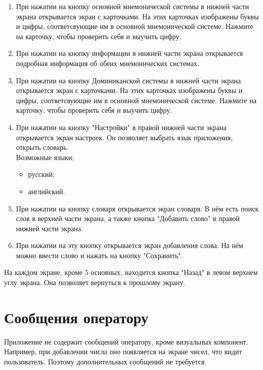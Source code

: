 \documentclass[draft]{article}
\begin{document}
\begin{enumerate}
\item При нажатии на кнопку основной мнемонической системы в нижней части экрана открывается экран с карточками. На этих карточках изображены буквы и цифры, соответсвующие им в основной мнемонической системе. Нажмите на карточку, чтобы проверить себя и выучить цифру.
\item При нажатии на кнопку информации в нижней части экрана открывается подробная информация об обеих мнемонических системах.
\item При нажатии на кнопку Доминиканской системы в нижней части экрана открывается экран с карточками. На этих карточках изображены буквы и цифры, соответсвующие им в основной мнемонической системе. Нажмите на карточку, чтобы проверить себя и выучить цифру.
\item При нажатии на кнопку "{}Настройки"{} в правой нижней части экрана открывается экран настроек. Он позволяет выбрать язык приложения, открыть словарь.\\
Возможные языки:
\begin{itemize}
\item русский;
\item английский.
\end{itemize}
\item При нажатии на кнопку словаря открывается экран словаря. В нём есть поиск слов в верхней части экрана, а также кнопка "{}Добавить слово"{} в правой нижней части экрана. 
\item При нажатии на эту кнопку открывается экран добавления слова. На нём можно ввести слово и нажать на кнопку "{}Сохранить"{}.
\end{enumerate}
На каждом экране, кроме 5 основных, находится кнопка "{}Назад"{} в левом верхнем углу экрана. Она позволяет вернуться к прошлому экрану.
\newpage
\section{Сообщения оператору}
Приложение не содержит сообщений оператору, кроме визуальных компонент. Например, при добавлении числа оно появляется на экране чисел, что видит пользователь. Поэтому дополнительных сообщений не требуется.
\newpage
{}
\end{document}
